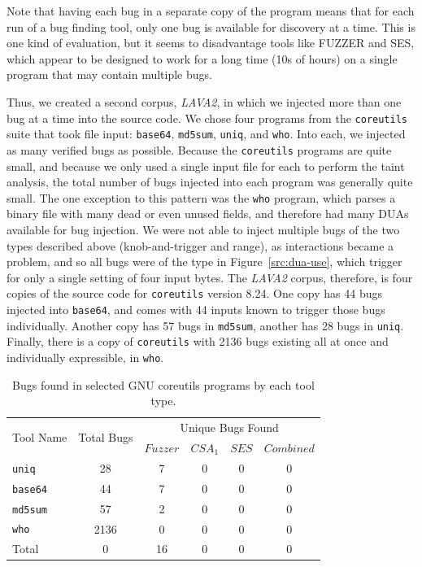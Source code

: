 Note that having each bug in a separate copy of the program means that for each run of a bug finding tool, only one bug is available for discovery at a time.  
This is one kind of evaluation, but it seems to disadvantage tools like FUZZER and SES, which appear to be designed to work for a long time (10s of hours) on a single program that may contain multiple bugs. 

Thus, we created a second corpus, \emph{LAVA2}, in which we injected more than one bug at a time into the source code.
We chose four programs from the \verb+coreutils+ suite that took file input: \verb+base64+, \verb+md5sum+, \verb+uniq+, and \verb+who+.
Into each, we injected as many verified bugs as possible.
Because the \verb+coreutils+ programs are quite small, and because we only used a single input file for each to perform the taint analysis, the total number of bugs injected into each program was generally quite small.
The one exception to this pattern was the \verb+who+ program, which parses a binary file with many dead or even unused fields, and therefore had many DUAs available for bug injection.
We were not able to inject multiple bugs of the two types described above (knob-and-trigger and range), as interactions became a problem, and so all bugs were of the type in Figure~\ref{src:dua-use}, which trigger for only a single setting of four input bytes.  
The \emph{LAVA2} corpus, therefore, is four copies of the source code for \verb+coreutils+ version 8.24.
One copy has 44 bugs injected into \verb+base64+, and comes with 44 inputs known to trigger those bugs individually.
Another copy has 57 bugs in \verb+md5sum+, another has 28 bugs in \verb+uniq+.
Finally, there is a copy of \verb+coreutils+ with 2136 bugs existing all at once and individually expressible, in \verb+who+.


\begin{table}[h]
\centering
\begin{tabular}{l|c|c|c|c|c} 
\multirow{2}{*}{Tool Name} & \multirow{2}{*}{Total Bugs} & \multicolumn{4}{c}{Unique Bugs Found} \\
              &            & $Fuzzer$    & $CSA_1$      & $SES$      & $Combined$ \\ \hline 
\verb+uniq+   &    28      & 7           & 0            & 0          & 0               \\
\verb+base64+ &    44      & 7           & 0            & 0          & 0               \\
\verb+md5sum+ &    57      & 2           & 0            & 0          & 0               \\
\verb+who+    &    2136    & 0           & 0            & 0          & 0               \\
Total         &    0       & 16          & 0            & 0          & 0               \\
\end{tabular}
\caption{Bugs found in selected GNU coreutils programs by each tool type.}
\label{table:tool-eval-results-coreutils}
\end{table}

